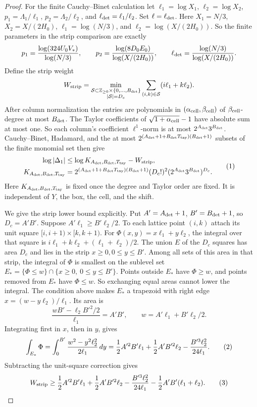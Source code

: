 \begin{proof}
For the finite Cauchy--Binet calculation let
\(\ell_1=\log X_1\), \(\ell_2=\log X_2\),
\(p_1=\Lambda_1/\ell_1\), \(p_2=\Lambda_2/\ell_2\), and
\(\ell_{\rm det}=\ell_1/\ell_2\). Set \(\ell=\ell_{\rm det}\).
Here \(X_1=N/3\), \(X_2=X/(2H_0)\),
\(\ell_1=\log(N/3)\), and \(\ell_2=\log(X/(2H_0))\). So the finite
parameters in the strip comparison are exactly
\[
 p_1=\frac{\log(324U_0V_*)}{\log(N/3)},\qquad
 p_2=\frac{\log(8D_0E_0)}{\log(X/(2H_0))},\qquad
 \ell_{\rm det}=\frac{\log(N/3)}{\log(X/(2H_0))}.
\]
Define the strip weight
\[
 W_{\rm strip}=\min_{\substack{\mathcal S\subset\mathbb Z_{\ge0}\times\{0,\ldots,B_{\rm det}\}\\
                                  |\mathcal S|=D_c}}
                  \sum_{(i,k)\in\mathcal S}(i\ell_1+k\ell_2).
\]
After column normalization the entries are polynomials in
\((\alpha_{\rm cell},\beta_{\rm cell})\) of \(\beta_{\rm cell}\)-degree
at most \(B_{\rm det}\). The Taylor coefficients of
\(\sqrt{1+\alpha_{\rm cell}}-1\) have absolute sum at most one. So each
column's coefficient \(\ell^1\)-norm is at most \(2^{A_{\rm det}}3^{B_{\rm det}}\).
Cauchy--Binet, Hadamard, and the at most
\(2^{(A_{\rm det}+1+B_{\rm det}T_{\rm tay})(B_{\rm det}+1)}\) subsets
of the finite monomial set
then give
\[
 \begin{aligned}
 \log|\Delta_1|&\le \log K_{A_{\rm det},B_{\rm det},T_{\rm tay}}-W_{\rm strip},\\
 K_{A_{\rm det},B_{\rm det},T_{\rm tay}}
 &=2^{(A_{\rm det}+1+B_{\rm det}T_{\rm tay})(B_{\rm det}+1)}(D_c!)^2
 (2^{A_{\rm det}}3^{B_{\rm det}})^{D_c}.
 \end{aligned}
\AutoTag{eq:old:7_10d}
\]
Here \(K_{A_{\rm det},B_{\rm det},T_{\rm tay}}\) is fixed once the degree
and Taylor order are fixed.
It is independent of \(Y\), the box, the cell, and the shift.

We give the strip lower bound explicitly. Put
\(A'=A_{\rm det}+1\), \(B'=B_{\rm det}+1\), so \(D_c=A'B'\).
Suppose
\(A'\ell_1\ge B'\ell_2/2\). To each lattice point
\((i,k)\) attach its unit square \([i,i+1)\times[k,k+1)\). For
\(\Phi(x,y)=x\ell_1+y\ell_2\), the integral over that square is
\(i\ell_1+k\ell_2+(\ell_1+\ell_2)/2\). The union \(E\) of the
\(D_c\) squares has area \(D_c\) and lies in the strip
\(x\ge0,0\le y\le B'\). Among all sets of this area in that strip, the
integral of \(\Phi\) is smallest on the sublevel set
\(E_* = \{\Phi\le w\}\cap\{x\ge0,\ 0\le y\le B'\}\). Points outside \(E_*\)
have \(\Phi\ge w\), and points removed from \(E_*\) have \(\Phi\le w\).
So exchanging equal areas cannot lower the integral. The condition above
makes \(E_*\) a trapezoid with right edge
\(x=(w-y\ell_2)/\ell_1\). Its area is
\[
 \frac{wB'-\ell_2B'^2/2}{\ell_1}=A'B',\qquad
 w=A'\ell_1+B'\ell_2/2.
\]
Integrating first in \(x\), then in \(y\), gives
\[
 \int_{E_*}\Phi
 =\int_0^{B'}\frac{w^2-y^2\ell_2^2}{2\ell_1}\,dy
 =\frac12A'^2B'\ell_1+\frac12A'B'^2\ell_2
   -\frac{B'^3\ell_2^2}{24\ell_1}.
\AutoTag{eq:old:7_10e}
\]
Subtracting the unit-square correction gives
\[
 W_{\rm strip}\ge \frac12A'^2B'\ell_1+
 \frac12A'B'^2\ell_2-\frac{B'^3\ell_2^2}{24\ell_1}
 -\frac12A'B'(\ell_1+\ell_2).
\AutoTag{eq:old:7_10f}
\]


\end{proof}
